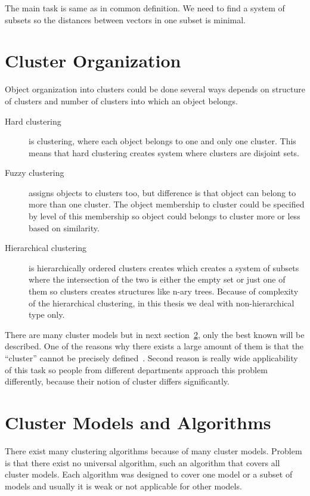 The main task is same as in common definition. We need to find a system of subsets so the distances between vectors in one subset is minimal.

\section{Cluster Organization} \label{sec:clusterorganization}
Object organization into clusters could be done several ways depends on structure of clusters and number of clusters into which an object belongs.
\begin{description}
\item[Hard clustering] is clustering, where each object belongs to one and only one cluster. This means that hard clustering creates system where clusters are disjoint sets.
\item[Fuzzy clustering] assigns objects to clusters too, but difference is that object can belong to more than one cluster. The object membership to cluster could be specified by level of this membership so object could belongs to cluster more or less based on similarity.
\item[Hierarchical clustering] is hierarchically ordered clusters creates which creates a system of subsets where the intersection of the two is either the empty set or just one of them so clusters creates structures like n-ary trees. Because of complexity of the hierarchical clustering, in this thesis we deal with non-hierarchical type only.
\end{description}

There are many cluster models but in next section~\ref{sec:clustermodels}, only the best known will be described. One of the reasons why there exists a large amount of them is that the ``cluster'' cannot be precisely defined~\cite{EstivillCastro02}. Second reason is really wide applicability of this task so people from different departments approach this problem differently, because their notion of cluster differs significantly. \\

\section{Cluster Models and Algorithms} \label{sec:clustermodels}
There exist many clustering algorithms because of many cluster models. Problem is that there exist no universal algorithm, such an algorithm that covers all cluster models. Each algorithm was designed to cover one model or a subset of models and usually it is weak or not applicable for other models.
